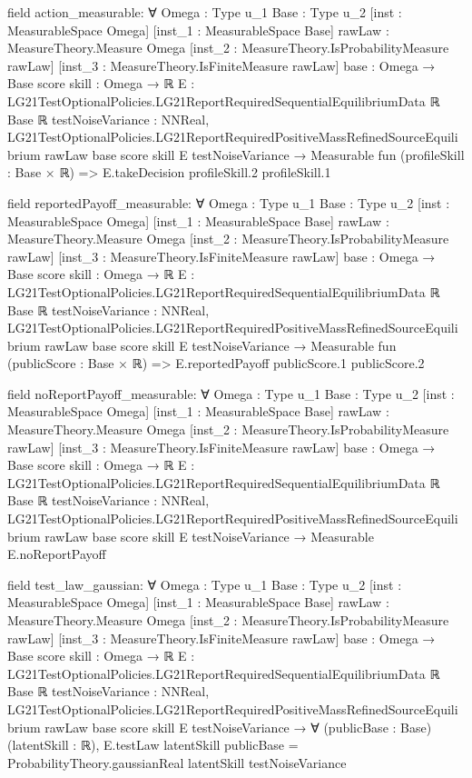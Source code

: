 \documentclass[10pt]{article}
\begin{document}
\begin{ReviewVerbatim}
field action_measurable:
∀ {Omega : Type u_1} {Base : Type u_2} [inst : MeasurableSpace Omega] [inst_1 : MeasurableSpace Base]
  {rawLaw : MeasureTheory.Measure Omega} [inst_2 : MeasureTheory.IsProbabilityMeasure rawLaw]
  [inst_3 : MeasureTheory.IsFiniteMeasure rawLaw] {base : Omega → Base} {score skill : Omega → ℝ}
  {E : LG21TestOptionalPolicies.LG21ReportRequiredSequentialEquilibriumData ℝ Base ℝ} {testNoiseVariance : NNReal},
  LG21TestOptionalPolicies.LG21ReportRequiredPositiveMassRefinedSourceEquilibrium rawLaw base score skill E
      testNoiseVariance →
    Measurable fun (profileSkill : Base × ℝ) => E.takeDecision profileSkill.2 profileSkill.1

field reportedPayoff_measurable:
∀ {Omega : Type u_1} {Base : Type u_2} [inst : MeasurableSpace Omega] [inst_1 : MeasurableSpace Base]
  {rawLaw : MeasureTheory.Measure Omega} [inst_2 : MeasureTheory.IsProbabilityMeasure rawLaw]
  [inst_3 : MeasureTheory.IsFiniteMeasure rawLaw] {base : Omega → Base} {score skill : Omega → ℝ}
  {E : LG21TestOptionalPolicies.LG21ReportRequiredSequentialEquilibriumData ℝ Base ℝ} {testNoiseVariance : NNReal},
  LG21TestOptionalPolicies.LG21ReportRequiredPositiveMassRefinedSourceEquilibrium rawLaw base score skill E
      testNoiseVariance →
    Measurable fun (publicScore : Base × ℝ) => E.reportedPayoff publicScore.1 publicScore.2

field noReportPayoff_measurable:
∀ {Omega : Type u_1} {Base : Type u_2} [inst : MeasurableSpace Omega] [inst_1 : MeasurableSpace Base]
  {rawLaw : MeasureTheory.Measure Omega} [inst_2 : MeasureTheory.IsProbabilityMeasure rawLaw]
  [inst_3 : MeasureTheory.IsFiniteMeasure rawLaw] {base : Omega → Base} {score skill : Omega → ℝ}
  {E : LG21TestOptionalPolicies.LG21ReportRequiredSequentialEquilibriumData ℝ Base ℝ} {testNoiseVariance : NNReal},
  LG21TestOptionalPolicies.LG21ReportRequiredPositiveMassRefinedSourceEquilibrium rawLaw base score skill E
      testNoiseVariance →
    Measurable E.noReportPayoff

field test_law_gaussian:
∀ {Omega : Type u_1} {Base : Type u_2} [inst : MeasurableSpace Omega] [inst_1 : MeasurableSpace Base]
  {rawLaw : MeasureTheory.Measure Omega} [inst_2 : MeasureTheory.IsProbabilityMeasure rawLaw]
  [inst_3 : MeasureTheory.IsFiniteMeasure rawLaw] {base : Omega → Base} {score skill : Omega → ℝ}
  {E : LG21TestOptionalPolicies.LG21ReportRequiredSequentialEquilibriumData ℝ Base ℝ} {testNoiseVariance : NNReal},
  LG21TestOptionalPolicies.LG21ReportRequiredPositiveMassRefinedSourceEquilibrium rawLaw base score skill E
      testNoiseVariance →
    ∀ (publicBase : Base) (latentSkill : ℝ),
      E.testLaw latentSkill publicBase = ProbabilityTheory.gaussianReal latentSkill testNoiseVariance


\end{ReviewVerbatim}
\end{document}
